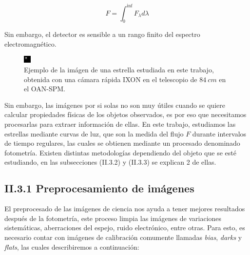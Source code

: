 \begin{equation}
  \displaystyle F = \int_{0}^{\inf} F_{\lambda}d\lambda
\end{equation}

Sin embargo, el detector es sensible a un rango finito del espectro electromagnético.


\begin{figure}[h!]
  \centering
    \includegraphics[scale=8]{./figures/wasp74b.png}
   \caption{Ejemplo de la imágen de una estrella estudiada en este trabajo, obtenida con una cámara rápida IXON en el telescopio de $84~cm$ en el OAN-SPM.}
    \label{fig_2_5_wasp74b}
\end{figure}

Sin embargo, las imágenes por si solas no son muy útiles cuando se quiere calcular propiedades físicas de los objetos observados, es por eso que necesitamos procesarlas para extraer información de ellas. En este trabajo, estudiamos las estrellas mediante curvas de luz, que son la medida del flujo $F$ durante intervalos de tiempo regulares, las cuales se obtienen mediante un procesado denominado fotometría. Existen distintas metodologías dependiendo del objeto que se esté estudiando, en las subsecciones (II.3.2) y (II.3.3) se explican 2 de ellas.

\subsection*{II.3.1 Preprocesamiento de imágenes}

El preprocesado de las imágenes de ciencia nos ayuda a tener mejores resultados después de la fotometría, este proceso limpia las imágenes de variaciones sistemáticas, aberraciones del espejo, ruido electrónico, entre otras. Para esto, es necesario contar con imágenes de calibración comumente llamadas \textit{bias}, \textit{darks} y \textit{flats}, las cuales describiremos a continuación:

